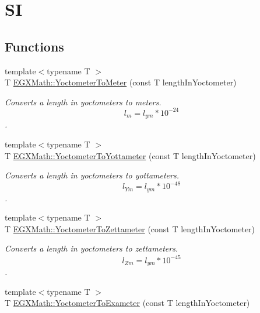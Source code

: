 \hypertarget{group___e_g_x_math-_conversions-_length_conversions-_s_i-_yoctometer-_s_i}{}\section{SI}
\label{group___e_g_x_math-_conversions-_length_conversions-_s_i-_yoctometer-_s_i}
\subsection*{Functions}
\begin{DoxyCompactItemize}
\item 
{\footnotesize template$<$typename T $>$ }\\T \mbox{\hyperlink{group___e_g_x_math-_conversions-_length_conversions-_s_i-_yoctometer-_s_i_ga35b89591930f45660f7dcdae8660b554}{E\+G\+X\+Math\+::\+Yoctometer\+To\+Meter}} (const T length\+In\+Yoctometer)
\begin{DoxyCompactList}\small\item\em Converts a length in yoctometers to meters. \[ l_{m}=l_{ym} * 10^{-24} \]. \end{DoxyCompactList}\item 
{\footnotesize template$<$typename T $>$ }\\T \mbox{\hyperlink{group___e_g_x_math-_conversions-_length_conversions-_s_i-_yoctometer-_s_i_ga6b9cdc15eb83cf15afe2a52430c84dc0}{E\+G\+X\+Math\+::\+Yoctometer\+To\+Yottameter}} (const T length\+In\+Yoctometer)
\begin{DoxyCompactList}\small\item\em Converts a length in yoctometers to yottameters. \[ l_{Ym}=l_{ym} * 10^{-48} \]. \end{DoxyCompactList}\item 
{\footnotesize template$<$typename T $>$ }\\T \mbox{\hyperlink{group___e_g_x_math-_conversions-_length_conversions-_s_i-_yoctometer-_s_i_gab7fc23a884fab0c6248edee754bd6e25}{E\+G\+X\+Math\+::\+Yoctometer\+To\+Zettameter}} (const T length\+In\+Yoctometer)
\begin{DoxyCompactList}\small\item\em Converts a length in yoctometers to zettameters. \[ l_{Zm}=l_{ym} * 10^{-45} \]. \end{DoxyCompactList}\item 
{\footnotesize template$<$typename T $>$ }\\T \mbox{\hyperlink{group___e_g_x_math-_conversions-_length_conversions-_s_i-_yoctometer-_s_i_ga2ffb14b252f7cc426a761de3930449a1}{E\+G\+X\+Math\+::\+Yoctometer\+To\+Exameter}} (const T length\+In\+Yoctometer)

\end{DoxyCompactItemize}
